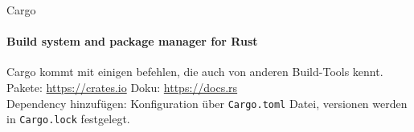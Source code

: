 \begin{frame}{Cargo}
    \framesubtitle{Build system and package manager for Rust}
    Cargo kommt mit einigen befehlen, die auch von anderen Build-Tools kennt.
    \pause
    Pakete: \url{https://crates.io} Doku: \url{https://docs.rs}\\
    Dependency hinzufügen:
    \pause
    Konfiguration über \texttt{Cargo.toml} Datei, versionen werden in \texttt{Cargo.lock} festgelegt.
\end{frame}

